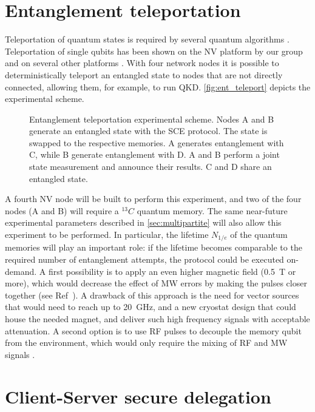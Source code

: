 \documentclass[a4paper, twoside]{article}
\begin{document}
\section{Entanglement teleportation}
\label{sec:teleportation}
Teleportation of quantum states is required by several quantum algorithms . Teleportation of single qubits has been shown on the NV platform by our group \cite{Pfaff2014} and on several other platforms \cite{Takeda2013, Wang2015, Valivarthi2016}.
With four network nodes it is possible to deterministically teleport an entangled state to nodes that are not directly connected, allowing them, for example, to run \ac{QKD}. \autoref{fig:ent_teleport} depicts the experimental scheme. 

\begin{figure}
	\caption{Entanglement teleportation experimental scheme. Nodes A and B generate an entangled state with the \ac{SCE} protocol. The state is swapped to the respective memories. A generates entanglement with C, while B generate entanglement with D. A and B perform a joint state measurement and announce their results. C and D share an entangled state. }
	\label{fig:ent_teleport}
\end{figure}

A fourth NV node will be built to perform this experiment, and two of the four nodes (A and B) will require a ${}^{13}C$ quantum memory. The same near-future experimental parameters described in \autoref{sec:multipartite} will also allow this experiment to be performed. In particular, the lifetime $N_{1/e}$ of the quantum memories will play an important role: if the lifetime becomes comparable to the required number of entanglement attempts, the protocol could be executed on-demand. A first possibility is to apply an even higher magnetic field (\SI{0.5}{T} or more), which would decrease the effect of \ac{MW} errors by making the pulses closer together (see Ref~\cite{Kalb2017}). A drawback of this approach is the need for vector sources that would need to reach up to \SI{20}{GHz}, and a new cryostat design that could house the needed magnet, and deliver such high frequency signals with acceptable attenuation.
A second option is to use \ac{RF} pulses to decouple the memory qubit from the environment, which would only require the mixing of \ac{RF} and \ac{MW} signals \cite{Bradley2018}. 

\section{Client-Server secure delegation}
\label{sec:delegation}
\end{document}
